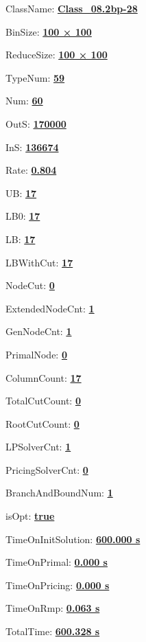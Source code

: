\documentclass[11pt]{article}
\begin{document}
\pagestyle{empty}


ClassName: \underline{\textbf{Class_08.2bp-28}}
\par
BinSize: \underline{\textbf{100 × 100}}
\par
ReduceSize: \underline{\textbf{100 × 100}}
\par
TypeNum: \underline{\textbf{59}}
\par
Num: \underline{\textbf{60}}
\par
OutS: \underline{\textbf{170000}}
\par
InS: \underline{\textbf{136674}}
\par
Rate: \underline{\textbf{0.804}}
\par
UB: \underline{\textbf{17}}
\par
LB0: \underline{\textbf{17}}
\par
LB: \underline{\textbf{17}}
\par
LBWithCut: \underline{\textbf{17}}
\par
NodeCut: \underline{\textbf{0}}
\par
ExtendedNodeCnt: \underline{\textbf{1}}
\par
GenNodeCnt: \underline{\textbf{1}}
\par
PrimalNode: \underline{\textbf{0}}
\par
ColumnCount: \underline{\textbf{17}}
\par
TotalCutCount: \underline{\textbf{0}}
\par
RootCutCount: \underline{\textbf{0}}
\par
LPSolverCnt: \underline{\textbf{1}}
\par
PricingSolverCnt: \underline{\textbf{0}}
\par
BranchAndBoundNum: \underline{\textbf{1}}
\par
isOpt: \underline{\textbf{true}}
\par
TimeOnInitSolution: \underline{\textbf{600.000 s}}
\par
TimeOnPrimal: \underline{\textbf{0.000 s}}
\par
TimeOnPricing: \underline{\textbf{0.000 s}}
\par
TimeOnRmp: \underline{\textbf{0.063 s}}
\par
TotalTime: \underline{\textbf{600.328 s}}
\par
\newpage


\end{document}
